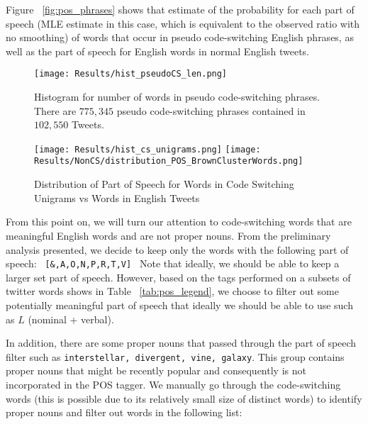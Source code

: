 \documentclass[conference]{IEEEtran}
\begin{document}
Figure ~\ref{fig:pos_phrases} shows that estimate of the probability for each part of speech (MLE estimate in this case, which is equivalent to the observed ratio with no smoothing) of words that occur in pseudo code-switching English phrases, as well as the part of speech for English words in normal English tweets. 



\begin{figure}[H]
	\centering
	\texttt{[image: Results/hist\_pseudoCS\_len.png]}
	\caption{Histogram for number of words in pseudo code-switching phrases. There are $775,345$  pseudo code-switching phrases  contained in  $102,550$ Tweets.}
	\label{fig:hist_cs_len}
\end{figure}







\begin{figure}[H]
	\centering
	\texttt{[image: Results/hist\_cs\_unigrams.png]}
	\texttt{[image: Results/NonCS/distribution\_POS\_BrownClusterWords.png]}
	\caption{Distribution of Part of Speech for Words in Code Switching Unigrams vs Words in English Tweets}
	\label{fig:pos_uni}
\end{figure}

From this point on, we will turn our attention to code-switching words that are meaningful English words and are not proper nouns. From the preliminary analysis presented, we decide to keep only the words with the following part of speech:  \verb| [&,A,O,N,P,R,T,V] | Note that ideally, we should be able to keep a larger set part of speech. However, based on the tags performed on a subsets of twitter words shows in Table ~\ref{tab:pos_legend}, we choose to filter out some potentially meaningful part of speech that ideally we should be able to use such as $L$ (nominal + verbal). 


In addition, there are some proper nouns that passed through the part of speech filter such as {\tt interstellar, divergent, vine, galaxy}. This group contains proper nouns that might be recently popular and consequently is not incorporated in the POS tagger. We manually go through the code-switching words (this is possible due to its relatively small size of distinct words) to identify proper nouns and filter out words in the following list:
\end{document}

